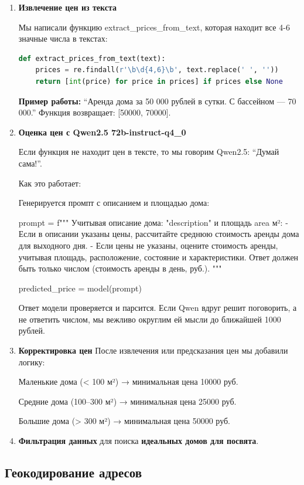 \documentclass{article}
\begin{document}
\begin{enumerate}
    \item \textbf{Извлечение цен из текста}
    
    Мы написали функцию extract\_prices\_from\_text, которая находит все 4-6 значные числа в текстах:
        \begin{lstlisting}[language=Python]
def extract_prices_from_text(text):
    prices = re.findall(r'\b\d{4,6}\b', text.replace(' ', ''))
    return [int(price) for price in prices] if prices else None
        \end{lstlisting}
    \textbf{Пример работы:}
    “Аренда дома за 50 000 рублей в сутки. С бассейном — 70 000.”
Функция возвращает: [50000, 70000].
    \item \textbf{Оценка цен с Qwen2.5 72b-instruct-q4\_0}
    
    Если функция не находит цен в тексте, то мы говорим Qwen2.5:
“Думай сама!”.

Как это работает:

Генерируется промпт с описанием и площадью дома:

prompt = f"""
Учитывая описание дома: "{description}" и площадь {area} м²:
- Если в описании указаны цены, рассчитайте среднюю стоимость аренды дома для выходного дня.
- Если цены не указаны, оцените стоимость аренды, учитывая площадь, расположение, состояние и характеристики.
Ответ должен быть только числом (стоимость аренды в день, руб.).
"""

predicted\_price = model(prompt)



Ответ модели проверяется и парсится. Если Qwen вдруг решит поговорить, а не ответить числом, мы вежливо округлим ей мысли до ближайшей 1000 рублей.

    \item \textbf{Корректировка цен}
    После извлечения или предсказания цен мы добавили логику:
    
Маленькие дома (< 100 м²) → минимальная цена 10000 руб.

Средние дома (100–300 м²) → минимальная цена 25000 руб.

Большие дома (> 300 м²) → минимальная цена 50000 руб.
    \item \textbf{Фильтрация данных} для поиска \textbf{идеальных домов для посвята}.
\end{enumerate}


\subsection{Геокодирование адресов}
\end{document}
